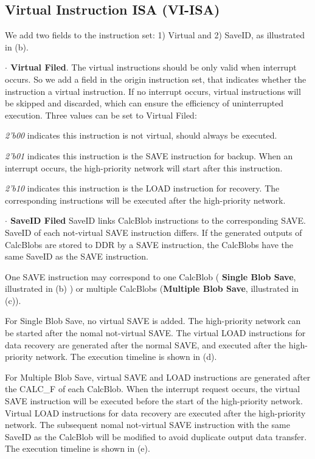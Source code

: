 \subsection{Virtual Instruction ISA (VI-ISA) }
\label{sec:virtualinstr}

We add two fields to the instruction set: 1) Virtual and 2) SaveID, as illustrated in (b). 

\textbf{ $ \cdot $  Virtual Filed}. The virtual instructions should be only valid when interrupt occurs. So we add a field in the origin instruction set, that indicates whether the instruction a virtual instruction. If no interrupt occurs, virtual instructions will be skipped and discarded, which can ensure the efficiency of uninterrupted execution. Three values can be set to Virtual Filed:

	\textit{2'b00} indicates this instruction is not virtual, should always be executed.
	
	\textit{2'b01} indicates this instruction is the SAVE instruction for backup. When an interrupt occurs, the high-priority network will start after this instruction.
	
	\textit{2'b10} indicates this instruction is the LOAD instruction for recovery. The corresponding instructions will be executed after the high-priority network.

\textbf{ $ \cdot $ SaveID Filed }
SaveID links CalcBlob instructions to the corresponding SAVE. SaveID of each not-virtual SAVE instruction differs. If the generated outputs of CalcBlobs are stored to DDR by a SAVE instruction, the CalcBlobs have the same SaveID as the SAVE instruction.

One SAVE instruction may correspond to one CalcBlob ( \textbf{Single Blob Save}, illustrated in (b) ) or multiple CalcBlobs (\textbf{Multiple Blob Save}, illustrated in (c)).

For Single Blob Save, no virtual SAVE is added. The high-priority network can be started after the nomal not-virtual SAVE. The virtual LOAD instructions for data recovery are generated after the normal SAVE, and executed after the high-priority network. The execution timeline is shown in (d).

For Multiple Blob Save, virtual SAVE and LOAD instructions are generated after the CALC\_F of each CalcBlob. When the interrupt request occurs, the virtual SAVE instruction will be executed before the start of the high-priority network. Virtual LOAD instructions for data recovery are executed after the high-priority network. The subsequent nomal not-virtual SAVE instruction with the same SaveID as the CalcBlob will be modified to avoid duplicate output data transfer. The execution timeline is shown in (e).



